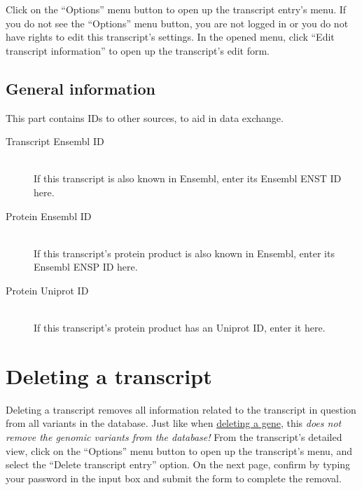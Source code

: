 \documentclass[a4paper,oneside,openany,12pt]{memoir}
\renewenvironment{leftbar}[1][\hsize]
{%
    \def\FrameCommand
    {%
        {\color{LOVDdark}\vrule width 3pt \hspace{5pt}}%
        \colorbox{LOVDlight}%
    }%
    \MakeFramed{\hsize#1\advance\hsize-\width\FrameRestore}%
}
{\endMakeFramed}
\begin{document}
Click on the ``Options'' menu button to open up the transcript entry's menu.
If you do not see the ``Options'' menu button, you are not logged in or you do not have rights to edit this transcript's settings.
In the opened menu, click ``Edit transcript information'' to open up the transcript's edit form.



\subsection{General information}
This part contains IDs to other sources, to aid in data exchange.
\begin{description}
  \item[Transcript Ensembl ID] \hfill \\
  If this transcript is also known in Ensembl, enter its Ensembl ENST ID here.
  \item[Protein Ensembl ID] \hfill \\
  If this transcript's protein product is also known in Ensembl, enter its Ensembl ENSP ID here.
  \item[Protein Uniprot ID] \hfill \\
  If this transcript's protein product has an Uniprot ID, enter it here.
\end{description}





\section{Deleting a transcript}
Deleting a transcript removes all information related to the transcript in question from all variants in the database.
Just like when \hyperlink{sec:gene_delete}{deleting a gene}, this \emph{does not remove the genomic variants from the database!}
From the transcript's detailed view, click on the ``Options'' menu button to open up the transcript's menu, and select the ``Delete transcript entry'' option.
On the next page, confirm by typing your password in the input box and submit the form to complete the removal.
\end{document}
